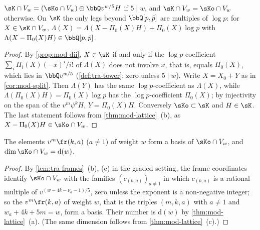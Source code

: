 \begin{cor}
\label{cor:mod-Ksplit}
$\sK\cap V_w=(\sKo\cap V_w)\oplus\bbQ v^{w/5}H$ if $5\mid w$, and $\sK\cap V_w=\sKo\cap V_w$ otherwise. On $\sK$ the only legs beyond $\bbQ[p,\bar p]$ are multiples of $\log p$: for $X\in\sK\cap V_w$, $\Lambda(X)=\Lambda(X-\Pi_0(X)H)+\Pi_0(X)\log p$ with $\Lambda(X-\Pi_0(X)H)\in\bbQ[p,\bar p]$.
\end{cor}

\begin{proof}
By \cref{prop:mod-dii}, $X\in\sK$ if and only if the $\log p$-coefficient $\sum_i\Pi_i(X)(-x)^i/i!$ of $\Lambda(X)$ does not involve $x$, that is, equals $\Pi_0(X)$, which lies in $\bbQ v^{w/5}$ (\cref{def:tra-tower}; zero unless $5\mid w$). Write $X=X_0+Y$ as in \cref{cor:mod-split}. Then $\Lambda(Y)$ has the same $\log p$-coefficient as $\Lambda(X)$, while $\Lambda(\Pi_0(X)H)=\Pi_0(X)\log p$ has the $\log p$-coefficient $\Pi_0(X)$; by injectivity on the span of the $v^m\psi^kH$, $Y=\Pi_0(X)H$. Conversely $\sKo\subset\sK$ and $H\in\sK$. The last statement follows from \cref{thm:mod-lattice}~(b), as $X-\Pi_0(X)H\in\sKo\cap V_w$.
\end{proof}

\begin{cor}
\label{cor:mod-basis}
The elements $v^m\fr(k,a)$ ($a\neq 1$) of weight $w$ form a basis of $\sKo\cap V_w$, and $\dim\sKo\cap V_w=\mathrm d(w)$.
\end{cor}

\begin{proof}
By \cref{lem:tra-frames}~(b), (c) in the graded setting, the frame coordinates identify $\sKo\cap V_w$ with the families $(c_{(k,a)})_{a\neq 1}$ in which $c_{(k,a)}$ is a rational multiple of $v^{(w-4k-\nu_a-1)/5}$, zero unless the exponent is a non-negative integer; so the $v^m\fr(k,a)$ of weight $w$, that is the triples $(m,k,a)$ with $a\neq 1$ and $w_a+4k+5m=w$, form a basis. Their number is $\mathrm d(w)$ by \cref{thm:mod-lattice}~(a). (The same dimension follows from \cref{thm:mod-lattice}~(c).)
\end{proof}



